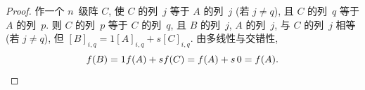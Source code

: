 \documentclass[../libro.tex]{subfiles}
\begin{document}
\begin{proof}
    作一个 \(n\)~级阵 \(C\),
    使 \(C\) 的列~\(j\) 等于 \(A\) 的列~\(j\)
    (若 \(j \neq q\)),
    且 \(C\) 的列~\(q\) 等于 \(A\) 的列~\(p\).
    则 \(C\) 的列~\(p\) 等于 \(C\) 的列~\(q\),
    且 \(B\) 的列~\(j\), \(A\) 的列~\(j\),
    与 \(C\) 的列~\(j\) 相等
    (若 \(j \neq q\)),
    但 \([B]_{i,q} = 1 [A]_{i,q} + s [C]_{i,q}\).
    由多线性与交错性,
    \begin{equation*}
        f (B)
        =
        1 f (A) + s f(C)
        =
        f (A) + s\, 0
        =
        f (A).
        \qedhere
    \end{equation*}




\end{proof}
\end{document}
